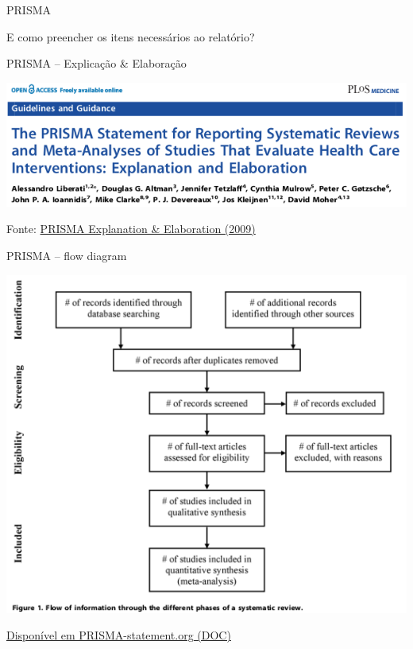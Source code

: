 \documentclass{beamer}
\begin{document}
\begin{frame}{PRISMA}
  \begin{center}
    E como preencher os itens necessários ao relatório?
  \end{center}
\end{frame}

\begin{frame}{PRISMA -- Explicação \& Elaboração}
  \begin{center}
    \includegraphics[width=\textwidth]{Revisao_resumo/PRISMA-EE}
  \end{center}

  \vfill
  \scriptsize
  \hfill Fonte: \href{https://doi.org/10.1371/journal.pmed.1000100}
  {\tiny PRISMA Explanation \& Elaboration (2009)}
\end{frame}

\begin{frame}{PRISMA -- flow diagram}
  \begin{center}
    \includegraphics[height=.8\textheight]{Revisao_resumo/PRISMA-flow}
  \end{center}

  \vfill
  \scriptsize
  \hfill \href{http://www.prisma-statement.org/}
  {\tiny Disponível em PRISMA-statement.org (DOC)}
\end{frame}
\end{document}
